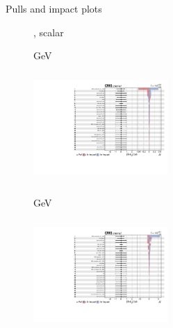 \documentclass[8pt]{beamer}
\begin{document}
\begin{frame}{Pulls and impact plots}
\justifying
\begin{figure}[htbp]
\centering
\begin{block}{, scalar}\end{block}	\vspace{-8pt}

\begin{minipage}[b]{0.49\textwidth}
\begin{center}
\centering \begin{block}{ GeV}\end{block}	
\includegraphics[width=5.1cm, height=4.2cm]{figs/2018/impacts_2018_both_scalar_100.pdf}
\end{center}
\end{minipage}\hfill
\begin{minipage}[b]{0.49\textwidth}
\begin{center}
\centering \begin{block}{ GeV}\end{block}	
\includegraphics[width=5.1cm, height=4.2cm]{figs/2018/impacts_2018_both_scalar_500.pdf}
\end{center}
\end{minipage} \hfill
\end{figure}
\end{frame}
\end{document}
